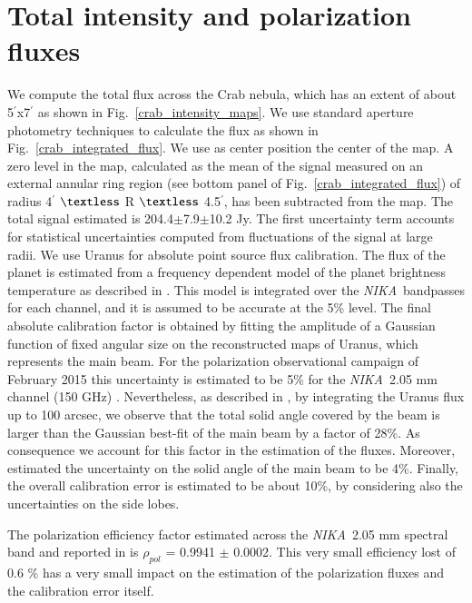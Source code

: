 \documentclass[twocolumn,traditabstract]{aa}
\def\NIKA{\textit{NIKA}}
\begin{document}
\section{Total intensity and polarization fluxes}\label{sec:Polarization estimates in CMB experiments like beams}
We compute the total flux across the Crab nebula, which has an extent of about
5$^{\prime}$x7$^{\prime}$ as shown in Fig.~\ref{crab_intensity_maps}.  We use
standard aperture photometry techniques to calculate the flux as shown in
Fig.~\ref{crab_integrated_flux}. We use as center position the center of the
map. A zero level in the map, calculated as the mean of the signal measured on
an external annular ring region (see bottom panel of
Fig.~\ref{crab_integrated_flux}) of radius 4$^\prime$ $\textless$ R $\textless$
4.5$^\prime$, has been subtracted from the map. The total signal estimated is
204.4$\pm$7.9$\pm$10.2 Jy. The first uncertainty term accounts for statistical
uncertainties computed from fluctuations of the signal at large radii.
We use Uranus for absolute point source flux calibration. The flux of the planet is estimated from a frequency dependent model of the planet brightness temperature as described in \cite{moreno2010}. 
This model is integrated over the \NIKA\ bandpasses for each channel, and it is assumed to be accurate at the 5\% level. The final absolute calibration factor is obtained by fitting the amplitude of a Gaussian function of fixed angular size on the reconstructed maps of Uranus, which represents the main beam. For the polarization observational campaign of February 2015 this uncertainty is estimated to be 5\% for the \NIKA\ 2.05 mm channel (150 GHz) \citep{ritacco2017}. 
Nevertheless, as described in \cite{adam2013, catalano2014}, by integrating the Uranus flux up to 100 arcsec, we observe that the total solid angle covered by the beam is larger than the Gaussian best-fit of the main beam by a factor of 28\%. As consequence we account for this factor in the estimation of the fluxes.
Moreover, \cite{adam2013} estimated the uncertainty on the solid angle of the main beam to be 4\%.
Finally, the overall calibration error is estimated to be about 10\%, by considering also the uncertainties on the side lobes.

The polarization efficiency factor estimated across the \NIKA\ 2.05 mm spectral band and reported in \cite{ritacco2017} is $\rho_{pol}$ = 0.9941 $\pm$ 0.0002. This very small efficiency lost of 0.6 \% has a very small impact on the estimation of the polarization fluxes and the calibration error itself. 
\end{document}
